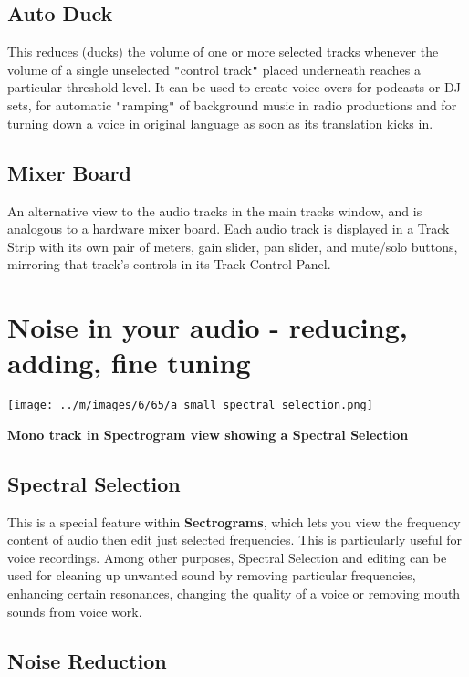 \documentclass[twocolumn]{book}
\begin{document}
\subsection{Auto Duck}


This reduces (ducks) the volume of one or more selected tracks whenever the volume of a single unselected \texttt{{}"{}}control track\texttt{{}"{}} placed underneath reaches a particular threshold level. It can be used to create voice-overs for podcasts or DJ sets, for automatic \texttt{{}"{}}ramping\texttt{{}"{}} of background music in radio productions and for turning down a voice in original language as soon as its translation kicks in.

\subsection{Mixer Board}


An alternative view to the audio tracks in the main tracks window, and is analogous to a hardware mixer board. Each audio track is displayed in a Track Strip with its own pair of meters, gain slider, pan slider, and mute/solo buttons, mirroring that track's controls in its Track Control Panel. 



\section{Noise in your audio - reducing, adding, fine tuning}

\par\texttt{[image: ../m/images/6/65/a\_small\_spectral\_selection.png]}\par\textbf{Mono track in Spectrogram view showing a Spectral Selection}

\subsection{Spectral Selection}


This is a special feature within \textbf{Sectrograms}, which lets you view the frequency content of audio then edit just selected frequencies.  This is particularly useful for voice recordings.  Among other purposes, Spectral Selection and editing can be used for cleaning up unwanted sound by removing particular frequencies, enhancing certain resonances, changing the quality of a voice or removing mouth sounds from voice work.

\subsection{Noise Reduction}
\end{document}
